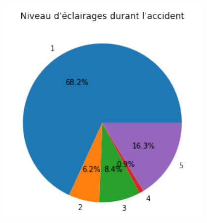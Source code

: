 \documentclass{beamer}
\theoremstyle{definition}
\begin{document}
\begin{frame}
\begin{minipage}[t]{1\linewidth}
		\begin{minipage}[t]{0.3\linewidth}\centering\begin{figure}
				\begin{center}
					\includegraphics[width=1\linewidth]{lum4.png}			
				\end{center}
			\end{figure}\end{minipage}\hfil
		\begin{minipage}[t]{0.3\linewidth}\centering\begin{figure}
				\begin{center}

\end{center}
\end{figure}
\end{minipage}
\end{minipage}
\end{frame}
\end{document}

